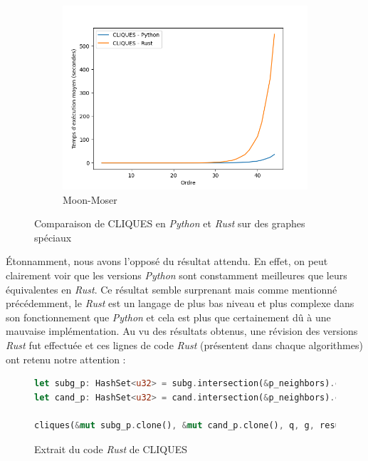 \documentclass[12pt,a4paper]{article}
\begin{document}
\begin{figure}[ht]
\begin{subfigure}[b]{0.32\textwidth}
    \includegraphics[width=\textwidth]{images/total_CLIQUES_pyrust_pivot_turan_plot.png}
  \caption{Moon-Moser}%
  \label{subfig:pr_cliques_turan}
  \end{subfigure}
  \caption{Comparaison de CLIQUES en \emph{Python} et \emph{Rust} sur des graphes spéciaux}%
  \label{fig:pvr_cliques}
\end{figure}

Étonnamment, nous avons l'opposé du résultat attendu. En effet, on peut clairement voir que les versions \emph{Python} sont constamment meilleures que leurs équivalentes en \emph{Rust}. Ce résultat semble surprenant mais comme mentionné précédemment, le \emph{Rust} est un langage de plus bas niveau et plus complexe dans son fonctionnement que \emph{Python} et cela est plus que certainement dû à une mauvaise implémentation. Au vu des résultats obtenus, une révision des versions \emph{Rust} fut effectuée et ces lignes de code \emph{Rust} (présentent dans chaque algorithmes) ont retenu notre attention :

\begin{figure}[ht]
  \begin{lstlisting}[language=Rust]
let subg_p: HashSet<u32> = subg.intersection(&p_neighbors).cloned().collect();
let cand_p: HashSet<u32> = cand.intersection(&p_neighbors).cloned().collect();

cliques(&mut subg_p.clone(), &mut cand_p.clone(), q, g, result, delay);
  \end{lstlisting}
  \caption{Extrait du code \emph{Rust} de CLIQUES}
  \label{fig:bad_rust}
\end{figure}
\end{document}
